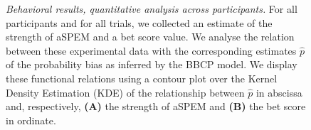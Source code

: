 \documentclass[12pt,english]{article}%
\newcommand{\seeFig}[1]{Figure~\ref{fig:#1}}
\begin{document}
\begin{figure}%
\caption{%
\emph{Behavioral results, quantitative analysis across participants.} %
For all participants and for all trials, we collected an estimate of
the strength of aSPEM and a bet score value.
We analyse the relation between these experimental data with the corresponding estimates $\hat{p}$
of the probability bias as inferred by the BBCP model.
We display these functional relations using a contour plot over
the Kernel Density Estimation (KDE) of the relationship between $\hat{p}$ in abscissa
and, respectively, \textbf{(A)} the strength of aSPEM and \textbf{(B)} the bet score in ordinate.
}
\end{figure}
\end{document}
